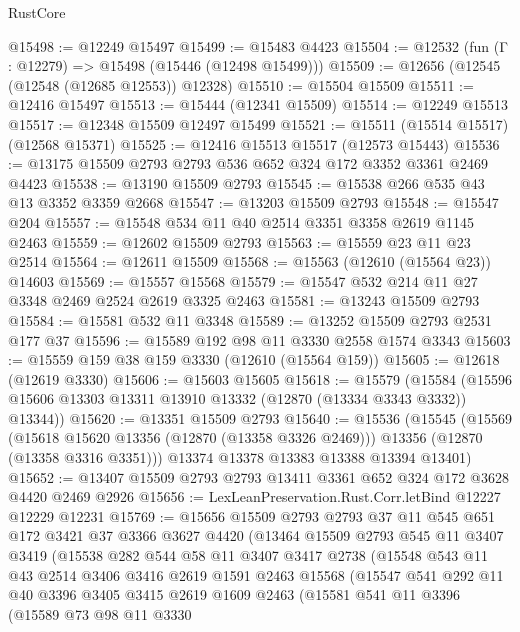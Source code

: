 \begin{lexlean}{RustCore}
\begin{coremodule}
@15498 := @12249 @15497
@15499 := @15483 @4423
@15504 := @12532 (fun (Γ : @12279) => @15498 (@15446 (@12498 @15499)))
@15509 := @12656 (@12545 (@12548 (@12685 @12553)) @12328)
@15510 := @15504 @15509
@15511 := @12416 @15497
@15513 := @15444 (@12341 @15509)
@15514 := @12249 @15513
@15517 := @12348 @15509 @12497 @15499
@15521 := @15511 (@15514 @15517) (@12568 @15371)
@15525 := @12416 @15513 @15517 (@12573 @15443)
@15536 := @13175 @15509 @2793 @2793 @536 @652 @324 @172 @3352 @3361 @2469 @4423
@15538 := @13190 @15509 @2793
@15545 := @15538 @266 @535 @43 @13 @3352 @3359 @2668
@15547 := @13203 @15509 @2793
@15548 := @15547 @204
@15557 := @15548 @534 @11 @40 @2514 @3351 @3358 @2619 @1145 @2463
@15559 := @12602 @15509 @2793
@15563 := @15559 @23 @11 @23 @2514
@15564 := @12611 @15509
@15568 := @15563 (@12610 (@15564 @23)) @14603
@15569 := @15557 @15568
@15579 := @15547 @532 @214 @11 @27 @3348 @2469 @2524 @2619 @3325 @2463
@15581 := @13243 @15509 @2793
@15584 := @15581 @532 @11 @3348
@15589 := @13252 @15509 @2793 @2531 @177 @37
@15596 := @15589 @192 @98 @11 @3330 @2558 @1574 @3343
@15603 := @15559 @159 @38 @159 @3330 (@12610 (@15564 @159))
@15605 := @12618 (@12619 @3330)
@15606 := @15603 @15605
@15618 := @15579
    (@15584 (@15596 @15606 @13303 @13311 @13910 @13332 (@12870 (@13334 @3343 @3332)) @13344))
@15620 := @13351 @15509 @2793
@15640 := @15536
    (@15545
      (@15569
        (@15618 @15620 @13356 (@12870 (@13358 @3326 @2469)))
        @13356
        (@12870 (@13358 @3316 @3351)))
      @13374
      @13378
      @13383
      @13388
      @13394
      @13401)
@15652 := @13407 @15509 @2793 @2793 @13411 @3361 @652 @324 @172 @3628 @4420 @2469 @2926
@15656 := LexLeanPreservation.Rust.Corr.letBind @12227 @12229 @12231
@15769 := @15656
    @15509
    @2793
    @2793
    @37
    @11
    @545
    @651
    @172
    @3421
    @37
    @3366
    @3627
    @4420
    (@13464
      @15509
      @2793
      @545
      @11
      @3407
      @3419
      (@15538
        @282
        @544
        @58
        @11
        @3407
        @3417
        @2738
        (@15548
          @543
          @11
          @43
          @2514
          @3406
          @3416
          @2619
          @1591
          @2463
          @15568
          (@15547
            @541
            @292
            @11
            @40
            @3396
            @3405
            @3415
            @2619
            @1609
            @2463
            (@15581
              @541
              @11
              @3396
              (@15589
                @73
                @98
                @11
                @3330

\end{coremodule}
\end{lexlean}
